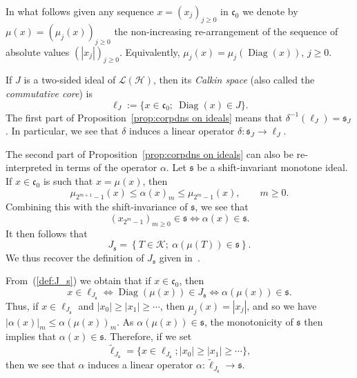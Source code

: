 \documentclass[10pt, a4paper]{amsart}
\newcommand{\sL}{\mathscr{L}}
\newcommand{\sH}{\mathscr{H}}
\newcommand{\sK}{\mathscr{K}}
\newcommand{\fs}{\mathfrak{s}}
\newcommand{\co}{\mathfrak{c}_{0}}
\newcommand{\op}{\operatorname}
\numberwithin{equation}{section}
\theoremstyle{definition}
\theoremstyle{remark}
\newcommand{\Diag}{\op{Diag}}
\begin{document}
In what follows given any sequence $x=(x_j)_{j\geq 0}$ in $\co$ we denote by $\mu(x)=(\mu_j(x))_{j\geq 0}$ the non-increasing re-arrangement of the sequence of absolute values $(|x_j|)_{j\geq 0}$. Equivalently, $\mu_j(x)=\mu_j(\Diag(x))$, $j\geq 0$.

If $J$ is a two-sided ideal of $\sL(\sH)$, then its \emph{Calkin space} (also called the \emph{commutative core}) is
\begin{equation*}
 \ell_J:=\{ x\in \co; \ \Diag(x)\in J\}.
\end{equation*}
The first part of Proposition~\ref{prop:corpdns on ideals} means that $\delta^{-1}(\ell_J)=\fs_J$. In particular, we see that $\delta$ induces a linear operator $\delta: \fs_J \rightarrow \ell_J$.

The second part of Proposition~\ref{prop:corpdns on ideals} can also be re-interpreted in terms of the operator $\alpha$. Let $\fs$ be a shift-invariant monotone ideal.
If $x\in \co$ is such that $x=\mu(x)$, then
\begin{equation*}
 \mu_{2^{m+1}-1}(x) \leq \alpha(x)_m \leq \mu_{2^{m}-1}(x), \qquad m\geq 0.
\end{equation*}
Combining this with the shift-invariance of $\fs$, we see that
\begin{equation*}
 (x_{2^m-1})_{m\geq 0} \in \fs \Longleftrightarrow \alpha(x)\in \fs.
\end{equation*}
It then follows that
\begin{equation}\label{def:J_s}
 J_\fs = \left\{ T\in \sK; \ \alpha(\mu(T))\in \fs\right\}.
\end{equation}
We thus recover the definition of $J_{\fs}$ given in~\cite[Chapter~4]{LSZ:Book}.

From~(\ref{def:J_s}) we obtain that if $x\in \co$, then
\begin{equation*}
 x\in \ell_{J_\fs}  \Longleftrightarrow  \Diag(\mu(x))\in J_\fs \Longleftrightarrow \alpha(\mu(x))\in \fs.
\end{equation*}
 Thus, if $x\in \ell_{J_\fs}$ and $|x_0|\geq |x_1|\geq \cdots$, then $\mu_j(x)=|x_j|$, and so we have $|\alpha(x)|_m\leq \alpha(\mu(x))_m$. As $\alpha(\mu(x))\in \fs$, the monotonicity of $\fs$ then implies that $\alpha(x)\in \fs$. Therefore, if we set
 \begin{equation*}
\tilde{\ell}_{J_\fs}=\big\{x \in  \ell_{J_\fs}; |x_0|\geq |x_1|\geq \cdots\big\},
\end{equation*}
 then we see that $\alpha$ induces a linear operator $\alpha:\tilde{\ell}_{J_\fs} \rightarrow \fs$.
\end{document}
